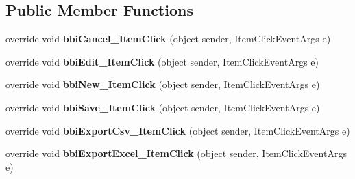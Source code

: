 \subsection*{Public Member Functions}
\begin{DoxyCompactItemize}
\item 
\mbox{\label{class_h_k_supply_1_1_forms_1_1_supply_1_1_supply_materials_1_1_packing_list_materials_a1947be74d474bc0e602630dcc1043214}} 
override void {\bfseries bbi\+Cancel\+\_\+\+Item\+Click} (object sender, Item\+Click\+Event\+Args e)
\item 
\mbox{\label{class_h_k_supply_1_1_forms_1_1_supply_1_1_supply_materials_1_1_packing_list_materials_aa966c73fa60524d8e4e92189931ab205}} 
override void {\bfseries bbi\+Edit\+\_\+\+Item\+Click} (object sender, Item\+Click\+Event\+Args e)
\item 
\mbox{\label{class_h_k_supply_1_1_forms_1_1_supply_1_1_supply_materials_1_1_packing_list_materials_ad7a68d121f04ddf0a7284f6383ea3996}} 
override void {\bfseries bbi\+New\+\_\+\+Item\+Click} (object sender, Item\+Click\+Event\+Args e)
\item 
\mbox{\label{class_h_k_supply_1_1_forms_1_1_supply_1_1_supply_materials_1_1_packing_list_materials_a6624066d1ea76851b82fc41a24aac45c}} 
override void {\bfseries bbi\+Save\+\_\+\+Item\+Click} (object sender, Item\+Click\+Event\+Args e)
\item 
\mbox{\label{class_h_k_supply_1_1_forms_1_1_supply_1_1_supply_materials_1_1_packing_list_materials_adf07fce9c4c2e1ee477c6a17acc1ce28}} 
override void {\bfseries bbi\+Export\+Csv\+\_\+\+Item\+Click} (object sender, Item\+Click\+Event\+Args e)
\item 
\mbox{\label{class_h_k_supply_1_1_forms_1_1_supply_1_1_supply_materials_1_1_packing_list_materials_acedd704b6aa0f804dd0eb4908f3fc7f3}} 
override void {\bfseries bbi\+Export\+Excel\+\_\+\+Item\+Click} (object sender, Item\+Click\+Event\+Args e)
\end{DoxyCompactItemize}
